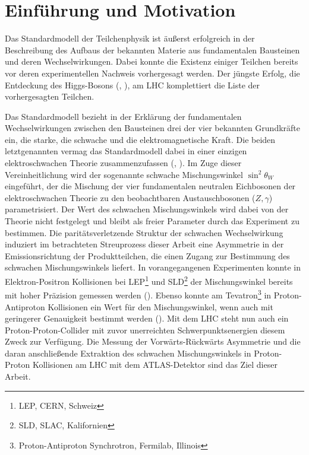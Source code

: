 


\chapter{Einführung und Motivation}


Das Standardmodell der Teilchenphysik ist äußerst erfolgreich in der
Beschreibung des Aufbaus der bekannten Materie aus fundamentalen Bausteinen und
deren Wechselwirkungen. Dabei konnte die Existenz einiger Teilchen bereits vor
deren experimentellen Nachweis vorhergesagt werden. Der jüngste Erfolg, die
Entdeckung des Higgs-Bosons (\cite{Aad:2012tfa}, \cite{Chatrchyan:2013lba}), am
\ac{LHC} komplettiert die Liste der vorhergesagten Teilchen.

Das Standardmodell bezieht in der Erklärung der fundamentalen Wechselwirkungen
zwischen den Bausteinen drei der vier bekannten Grundkräfte ein, die starke,
die schwache und die elektromagnetische Kraft. Die beiden letztgenannten vermag
das Standardmodell dabei in einer einzigen elektroschwachen Theorie
zusammenzufassen (\cite{Glashow:1961tr}, \cite{Weinberg:1967tq}). Im Zuge
dieser Vereinheitlichung wird der sogenannte schwache Mischungswinkel
$\sin^2\theta_W$ eingeführt, der die Mischung der vier fundamentalen neutralen
Eichbosonen der elektroschwachen Theorie zu den beobachtbaren Austauschbosonen
($Z,\gamma$) parametrisiert. Der Wert des schwachen Mischungswinkels wird dabei
von der Theorie nicht festgelegt und bleibt als freier Parameter durch das
Experiment zu bestimmen. Die paritätsverletzende Struktur der schwachen
Wechselwirkung induziert im betrachteten Streuprozess dieser Arbeit eine
Asymmetrie in der Emissionsrichtung der Produktteilchen, die einen Zugang zur
Bestimmung des schwachen Mischungswinkels liefert. In vorangegangenen
Experimenten konnte in Elektron-Positron Kollisionen bei
\acs{LEP}\footnote{\acf{LEP}, \acs{CERN}, Schweiz} und
\acs{SLD}\footnote{\acf{SLD}, \acs{SLAC}, Kalifornien} der Mischungswinkel
bereits mit hoher Präzision gemessen werden (\cite{PhysRevD.86.010001}). Ebenso
konnte am Tevatron\footnote{Proton-Antiproton Synchrotron, Fermilab, Illinois}
in Proton-Antiproton Kollisionen ein Wert für den Mischungswinkel, wenn auch
mit geringerer Genauigkeit bestimmt werden (\cite{Abazov:2011ws}). Mit dem
\ac{LHC} steht nun auch ein Proton-Proton-Collider mit zuvor unerreichten
Schwerpunktsenergien diesem Zweck zur Verfügung. Die Messung der
Vorwärts-Rückwärts Asymmetrie und die daran anschließende Extraktion des
schwachen Mischungswinkels in Proton-Proton Kollisionen am \ac{LHC} mit dem
ATLAS-Detektor sind das Ziel dieser Arbeit.

